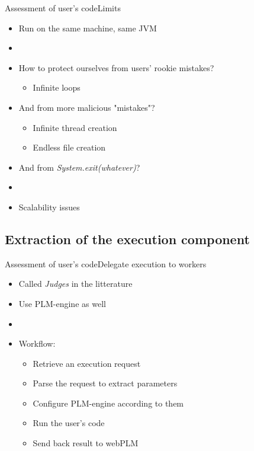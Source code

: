 \documentclass{beamer}
\begin{document}
\begin{frame}{Assessment of user's code}{Limits}
  \begin{itemize}
  \item {
    Run on the same machine, same JVM
    \pause
  }
  \item[~]
  \item {
    How to protect ourselves from users' rookie mistakes?
    \begin{itemize}
    \item {
      Infinite loops
    }
    \end{itemize}
    \pause
  }
  \item {
    And from more malicious "mistakes"?
    \begin{itemize}
    \item {
      Infinite thread creation
    }
    \item {
      Endless file creation
    }
    \end{itemize}
    \pause
  }
  \item {
    And from \emph{System.exit(whatever)}?
    \pause
  }
  \item[~]
  \item {
    Scalability issues
  }
  \end{itemize}
\end{frame}

\subsection{Extraction of the execution component}

\begin{frame}{Assessment of user's code}{Delegate execution to workers}
  \begin{itemize}
  \item Called \emph{Judges} in the litterature
  \item Use PLM-engine as well
  \item[~]
  \item {
    Workflow:
    \begin{itemize}
    \item Retrieve an execution request
    \item Parse the request to extract parameters
    \item Configure PLM-engine according to them
    \item Run the user's code
    \item Send back result to webPLM
    \end{itemize}
  }
  \end{itemize}
\end{frame}
\end{document}
